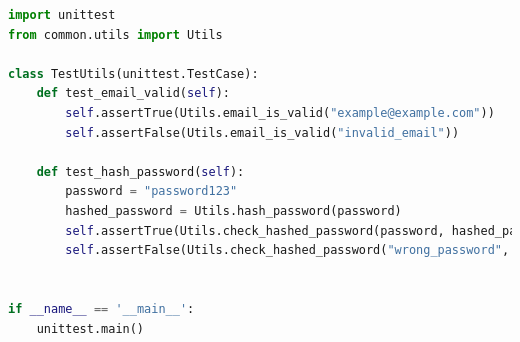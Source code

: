 \documentclass[a4paper,12pt]{article}
\begin{document}
\begin{lstlisting}[language=Python, caption=Implementation der Utils-Tests, label=lst:utilstest]
import unittest
from common.utils import Utils

class TestUtils(unittest.TestCase):
    def test_email_valid(self):
        self.assertTrue(Utils.email_is_valid("example@example.com"))
        self.assertFalse(Utils.email_is_valid("invalid_email"))

    def test_hash_password(self):
        password = "password123"
        hashed_password = Utils.hash_password(password)
        self.assertTrue(Utils.check_hashed_password(password, hashed_password))
        self.assertFalse(Utils.check_hashed_password("wrong_password", hashed_password))


if __name__ == '__main__':
    unittest.main()
\end{lstlisting}
\end{document}
